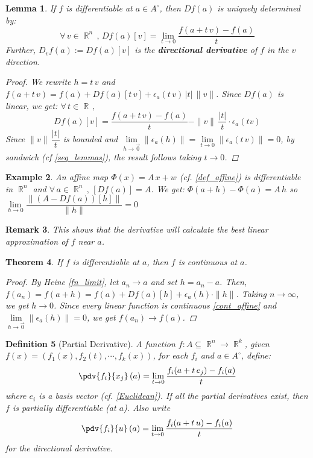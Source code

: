 \documentclass[12pt]{article}
\let\ee\epsilon
\newcommand{\Forall}[1]{\forall\,{#1}\,,\,}
\DeclareMathOperator{\R}{\mathbb{R}}
\newtheorem{theorem}{Theorem}[subsection]
\newtheorem{definition}[theorem]{Definition}
\newtheorem{lemma}[theorem]{Lemma}
\newtheorem{example}[theorem]{Example}
\newtheorem{remark}[theorem]{Remark}
\begin{document}
\begin{lemma}
  \label{unique_deriv}
  If $f$ is differentiable at $a\in A^\circ$, then $Df(a)$ is uniquely determined by: $$\Forall{v\in\R^n}Df(a)[v]=\lim_{t\to 0}\frac{f(a+t\,v)-f(a)}{t}$$ Further, $D_v f(a):=Df(a)[v]$ is the \textbf{directional derivative} of $f$ in the $v$ direction.
  \begin{proof}
    We rewrite $h=t\,v$ and $f(a+t\,v)=f(a)+Df(a)[t\,v]+\ee_a(t\,v)\,|t|\,\|v\|$. Since $Df(a)$ is linear, we get: $\Forall{t\in\R}$ $$Df(a)[v]=\frac{f(a+t\,v)-f(a)}{t}-\|v\|\,\frac{|t|}{t}\cdot\ee_a(tv)$$
    Since $\|v\|\,\dfrac{|t|}{t}$ is bounded and $\lim\limits_{h\to\vec{0}}\|\ee_a(h)\|=\lim\limits_{t\to 0}\|\ee_a(t\,v)\|=0$, by sandwich (cf \ref{seq_lemmas}), the result follows taking $t\to 0$.
  \end{proof}
\end{lemma}

\begin{example}
  An affine map $\Phi(x)=A\,x+w$ (cf. \ref{def_affine}) is differentiable in $\R^n$ and $\Forall{a\in\R^n}[Df(a)]=A$. We get: $\Phi(a+h)-\Phi(a)=A\,h$ so $\lim\limits_{h\to 0}\dfrac{\|(A-Df(a))[h]\|}{\|h\|}=0$
\end{example}

\begin{remark}
  This shows that the derivative will calculate the best linear approximation of $f$ near $a$.
\end{remark}

\begin{theorem}
  If $f$ is differentiable at $a$, then $f$ is continuous at $a$.
  \begin{proof}
    By Heine \ref{fn_limit}, let $a_n\to a$ and set $h=a_n-a$. Then, $f(a_n)=f(a+h)=f(a)+Df(a)[h]+\ee_a(h)\cdot\|h\|$. Taking $n\to \infty$, we get $h\to 0$. Since every linear function is continuous \ref{cont_affine} and $\lim\limits_{h\to\vec{0}}\|\ee_a(h)\|=0$, we get $f(a_n)\to f(a)$.
  \end{proof}
\end{theorem}

\begin{definition}[Partial Derivative]
  \label{partial_derivative}
  A function $f:A\subseteq\R^n\to\R^k$, given $f(x)=(f_1(x),f_2(t),\cdots,f_k(x))$, for each $f_i$ and $a\in A^\circ$, define: $$\pdv{f_i}{x_j}\,(a)=\lim _{t\to 0}\frac{f_i(a+t\,e_j)-f_i(a)}{t}$$ where $e_i$ is a basis vector (cf. \ref{Euclidean}). If all the partial derivatives exist, then $f$ is partially differentiable (at $a$). Also write $$\pdv{f_i}{u}\,(a)=\lim _{t\to 0}\frac{f_i(a+t\,u)-f_i(a)}{t}$$ for the directional derivative.
\end{definition}
\end{document}
